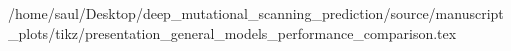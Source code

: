 /home/saul/Desktop/deep_mutational_scanning_prediction/source/manuscript_plots/tikz/presentation_general_models_performance_comparison.tex